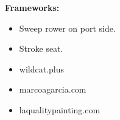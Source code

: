 \documentclass[10pt,a4paper,ragged2e,withhyper]{altacv}
\begin{document}
\begin{paracol}{2}
      \textbf{Frameworks:}
      \newline
      \newline
      
      \newline

      \begin{itemize}
      \item Sweep rower on port side.
      \item Stroke seat.
      \end{itemize}
      
      \begin{itemize}
      \item wildcat.plus
      \item marcoagarcia.com
      \item laqualitypainting.com
      \end{itemize}
      

    \end{paracol}

  
\end{document}

